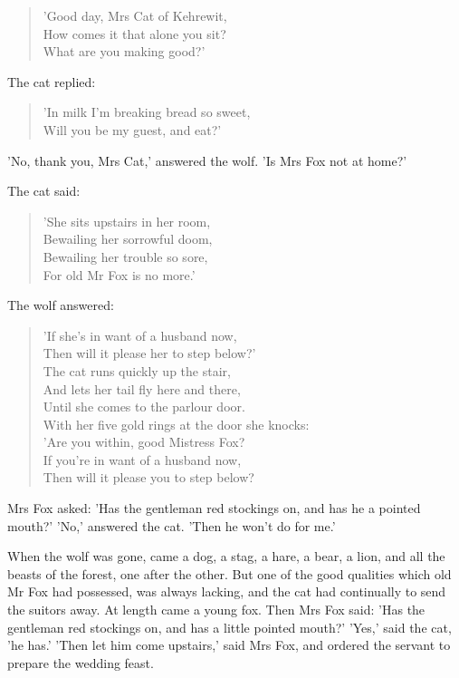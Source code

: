 \documentclass[12pt]{book}
\begin{document}
\begin{verse}
 'Good day, Mrs Cat of Kehrewit,\\
  How comes it that alone you sit?\\
  What are you making good?'
\end{verse}

The cat replied:

\begin{verse}
 'In milk I'm breaking bread so sweet,\\
  Will you be my guest, and eat?'
\end{verse}

'No, thank you, Mrs Cat,' answered the wolf. 'Is Mrs Fox not at home?'

The cat said:

\begin{verse}
 'She sits upstairs in her room,\\
  Bewailing her sorrowful doom,\\
  Bewailing her trouble so sore,\\
  For old Mr Fox is no more.'
\end{verse}

The wolf answered:

\begin{verse}
 'If she's in want of a husband now,\\
  Then will it please her to step below?'\\
  The cat runs quickly up the stair,\\
  And lets her tail fly here and there,\\
  Until she comes to the parlour door.\\
  With her five gold rings at the door she knocks:\\
 'Are you within, good Mistress Fox?\\
  If you're in want of a husband now,\\
  Then will it please you to step below?
\end{verse}

Mrs Fox asked: 'Has the gentleman red stockings on, and has he a
pointed mouth?' 'No,' answered the cat. 'Then he won't do for me.'

When the wolf was gone, came a dog, a stag, a hare, a bear, a lion,
and all the beasts of the forest, one after the other. But one of the
good qualities which old Mr Fox had possessed, was always lacking, and
the cat had continually to send the suitors away. At length came a
young fox. Then Mrs Fox said: 'Has the gentleman red stockings on, and
has a little pointed mouth?' 'Yes,' said the cat, 'he has.' 'Then let
him come upstairs,' said Mrs Fox, and ordered the servant to prepare
the wedding feast.
\end{document}
